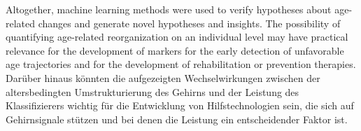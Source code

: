 Altogether, machine learning methods were used to verify hypotheses about age-related changes and generate novel hypotheses and insights. The possibility of quantifying age-related reorganization on an individual level may have practical relevance for the development of markers for the early detection of unfavorable age trajectories and for the development of rehabilitation or prevention therapies. Darüber hinaus könnten die aufgezeigten Wechselwirkungen zwischen der altersbedingten Umstrukturierung des Gehirns und der Leistung des Klassifizierers wichtig für die Entwicklung von Hilfstechnologien sein, die sich auf Gehirnsignale stützen und bei denen die Leistung ein entscheidender Faktor ist.

